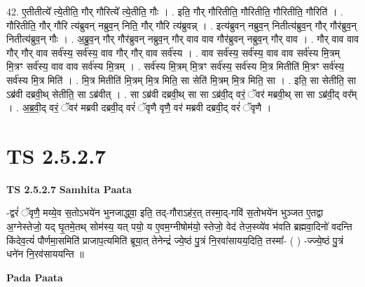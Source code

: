 \documentclass[17pt]{extarticle}
\begin{document}
42. ए॒तीतीत्ये᳚ त्ये॒तीति॒ गौर् गौरित्ये᳚ त्ये॒तीति॒ गौः । . इति॒ गौर् गौरितीति॒ गौरितीति॒ गौरितीति॒ गौरिति॑ । . गौरितीति॒ गौर् गौरि त्य॑ब्रुवन् नब्रुव॒न् निति॒ गौर् गौरि त्य॑ब्रुवन्न् । . इत्य॑ब्रुवन् नब्रुव॒न् नितीत्य॑ब्रुव॒न् गौर् गौर॑ब्रुव॒न् नितीत्य॑ब्रुव॒न् गौः । . अ॒ब्रु॒व॒न् गौर् गौर॑ब्रुवन् नब्रुव॒न् गौर् वाव वाव गौर॑ब्रुवन् नब्रुव॒न् गौर् वाव । . गौर् वाव वाव गौर् गौर् वाव सर्व॑स्य॒ सर्व॑स्य॒ वाव गौर् गौर् वाव सर्व॑स्य । . वाव सर्व॑स्य॒ सर्व॑स्य॒ वाव वाव सर्व॑स्य मि॒त्रम् मि॒त्रꣳ सर्व॑स्य॒ वाव वाव सर्व॑स्य मि॒त्रम् । . सर्व॑स्य मि॒त्रम् मि॒त्रꣳ सर्व॑स्य॒ सर्व॑स्य मि॒त्र मितीति॑ मि॒त्रꣳ सर्व॑स्य॒ सर्व॑स्य मि॒त्र मिति॑ । . मि॒त्र मितीति॑ मि॒त्रम् मि॒त्र मिति॒ सा सेति॑ मि॒त्रम् मि॒त्र मिति॒ सा । . इति॒ सा सेतीति॒ सा ऽब्र॑वी दब्रवी॒थ् सेतीति॒ सा ऽब्र॑वीत् । . सा ऽब्र॑वी दब्रवी॒थ् सा सा ऽब्र॑वी॒द् वरं॒ ॅवर॑ मब्रवी॒थ् सा सा ऽब्र॑वी॒द् वर᳚म् । . अ॒ब्र॒वी॒द् वरं॒ ॅवर॑ मब्रवी दब्रवी॒द् वरं॑ ॅवृणै वृणै॒ वर॑ मब्रवी दब्रवी॒द् वरं॑ ॅवृणै । \newline
\pagebreak
{}
\section*{ TS 2.5.2.7 }

\textbf{TS 2.5.2.7 } \newline
\textbf{Samhita Paata} \newline

-द्वरं॑ ॅवृणै॒ मय्ये॒व स॒तोऽभये॑न भुनजाद्ध्वा॒ इति॒ तद्-गौराऽह॑र॒त् तस्मा॒द्-गवि॑ स॒तोभये॑न भुञ्जत ए॒तद्वा अ॒ग्नेस्तेजो॒ यद् घृ॒तमे॒तथ् सोम॑स्य॒ यत् पयो॒ य ए॒वम॒ग्नीषोम॑यो॒ स्तेजो॒ वेद॑ तेज॒स्व्ये॑व भ॑वति ब्रह्मवा॒दिनो॑ वदन्ति किंदेव॒त्यं॑ पौर्णमा॒समिति॑ प्राजाप॒त्यमिति॑ ब्रूया॒त् तेनेन्द्रं॑ ज्ये॒ष्ठं पु॒त्रं नि॒रवा॑सायय॒दिति॒ तस्मा᳚- ( ) -ज्ज्ये॒ष्ठं पु॒त्रं धने॑न नि॒रव॑साययन्ति ॥ \newline

\textbf{Pada Paata} \newline
\end{document}
